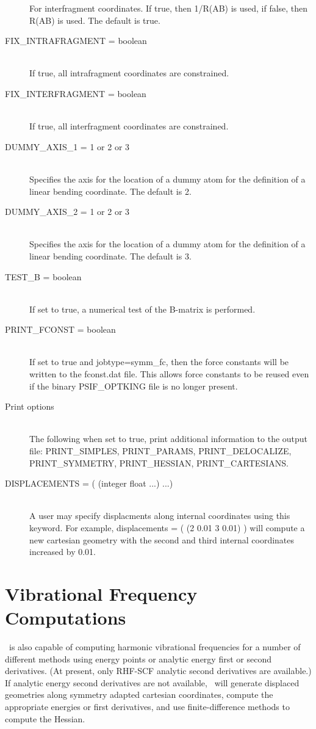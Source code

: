 \begin{description}
For interfragment coordinates.  If true, then 1/R(AB) is used, if false,
then R(AB) is used.  The default is true.
\item[FIX\_INTRAFRAGMENT = boolean]\mbox{}\\
If true, all intrafragment coordinates are constrained.
\item[FIX\_INTERFRAGMENT = boolean]\mbox{}\\
If true, all interfragment coordinates are constrained.
\item[DUMMY\_AXIS\_1 = 1 or 2 or 3]\mbox{}\\
Specifies the axis for the location of a dummy atom for the definition
of a linear bending coordinate.  The default is 2.
\item[DUMMY\_AXIS\_2 = 1 or 2 or 3]\mbox{}\\
Specifies the axis for the location of a dummy atom for the definition
of a linear bending coordinate.  The default is 3.
\item[TEST\_B = boolean]\mbox{}\\
If set to true, a numerical test of the B-matrix is performed.
\item[PRINT\_FCONST = boolean]\mbox{}\\
If set to true and jobtype=symm\_fc, then the force constants will
be written to the fconst.dat file.  This allows force constants to be
reused even if the binary PSIF\_OPTKING file is no longer present.
\item[Print options]\mbox{}\\
The following when set to true, print additional information to the
output file: PRINT\_SIMPLES, PRINT\_PARAMS, PRINT\_DELOCALIZE,
PRINT\_SYMMETRY, PRINT\_HESSIAN, PRINT\_CARTESIANS.
\item[DISPLACEMENTS = ( (integer float ...) ...)]\mbox{}\\
A user may specify displacments along internal coordinates using this
keyword.  For example, displacements = ( (2 0.01 3 0.01) ) will compute
a new cartesian geometry with the second and third internal coordinates
increased by 0.01.
\end{description}


\section{Vibrational Frequency Computations} \label{freq}
\PSIthree\ is also capable of computing harmonic vibrational frequencies
for a number of different methods using energy points or analytic energy first or
second derivatives.  (At present, only RHF-SCF analytic second derivatives
are available.)  If analytic energy second derivatives are not available,
\PSIthree\ will generate displaced geometries along symmetry adapted cartesian
coordinates, compute the appropriate energies or first derivatives, and use
finite-difference methods to compute the Hessian.

